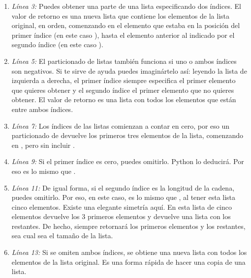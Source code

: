 \begin{enumerate}

\item \emph{Línea 3:} Puedes obtener una parte de una lista especificando dos índices. El valor de retorno es una nueva lista que contiene los elementos de la lista original, en orden, comenzando en el elemento que estaba en la posición del primer índice (en este caso ), hasta el elemento anterior al indicado por el segundo índice (en este caso ).

\item \emph{Línea 5:}  El particionado de listas también funciona si uno o ambos índices son negativos. Si te sirve de ayuda puedes imaginártelo así: leyendo la lista de izquierda a derecha, el primer índice siempre especifica el primer elemento que quieres obtener y el segundo índice el primer elemento que no quieres obtener. El valor de retorno es una lista con todos los elementos que están entre ambos índices.

\item \emph{Línea 7:} Los índices de las listas comienzan a contar en cero, por eso un particionado de  devuelve los primeros tres elementos de la lista, comenzando en , pero sin incluir .

\item \emph{Línea 9:} Si el primer índice es cero, puedes omitirlo. Python lo deducirá. Por eso  es lo mismo que .

\item \emph{Línea 11:} De igual forma, si el segundo índice es la longitud de la cadena, puedes omitirlo. Por eso, en este caso,  es lo mismo que , al tener esta lista cinco elementos. Existe una elegante simetría aquí. En esta lista de cinco elementos  devuelve los 3 primeros elementos y  devuelve una lista con los restantes. De hecho,  siempre retornará los  primeros elementos y  los restantes, sea cual sea el tamaño de la lista.

\item \emph{Línea 13:} Si se omiten ambos índices, se obtiene una nueva lista con todos los elementos de la lista original. Es una forma rápida de hacer una copia de una lista.

\end{enumerate}

